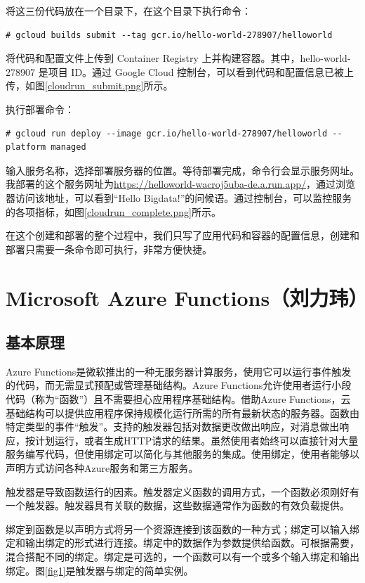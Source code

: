 \documentclass[11pt]{article}
\begin{document}
将这三份代码放在一个目录下，在这个目录下执行命令：
\begin{lstlisting}
# gcloud builds submit --tag gcr.io/hello-world-278907/helloworld
\end{lstlisting}
将代码和配置文件上传到 Container Registry 上并构建容器。其中，hello-world-278907 是项目 ID。通过 Google Cloud 控制台，可以看到代码和配置信息已被上传，如图\ref{cloudrun_submit.png}所示。

执行部署命令：
\begin{lstlisting}
# gcloud run deploy --image gcr.io/hello-world-278907/helloworld --platform managed
\end{lstlisting}
输入服务名称，选择部署服务器的位置。等待部署完成，命令行会显示服务网址。我部署的这个服务网址为\url{https://helloworld-wacroj5uba-de.a.run.app/}，通过浏览器访问该地址，可以看到“Hello Bigdata!”的问候语。通过控制台，可以监控服务的各项指标，如图\ref{cloudrun_complete.png}所示。

在这个创建和部署的整个过程中，我们只写了应用代码和容器的配置信息，创建和部署只需要一条命令即可执行，非常方便快捷。

\newpage
\section{Microsoft Azure Functions（刘力玮）}
\subsection{基本原理}
Azure Functions是微软推出的一种无服务器计算服务，使用它可以运行事件触发的代码，而无需显式预配或管理基础结构。Azure Functions允许使用者运行小段代码（称为“函数”）且不需要担心应用程序基础结构。借助Azure Functions，云基础结构可以提供应用程序保持规模化运行所需的所有最新状态的服务器。函数由特定类型的事件“触发”。支持的触发器包括对数据更改做出响应，对消息做出响应，按计划运行，或者生成HTTP请求的结果。虽然使用者始终可以直接针对大量服务编写代码，但使用绑定可以简化与其他服务的集成。使用绑定，使用者能够以声明方式访问各种Azure服务和第三方服务。

触发器是导致函数运行的因素。触发器定义函数的调用方式，一个函数必须刚好有一个触发器。触发器具有关联的数据，这些数据通常作为函数的有效负载提供。

绑定到函数是以声明方式将另一个资源连接到该函数的一种方式；绑定可以输入绑定和输出绑定的形式进行连接。绑定中的数据作为参数提供给函数。可根据需要，混合搭配不同的绑定。绑定是可选的，一个函数可以有一个或多个输入绑定和输出绑定。图\ref{fig1}是触发器与绑定的简单实例。
\end{document}
